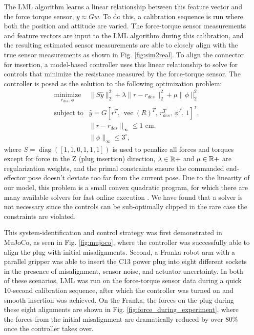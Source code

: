 The LML algorithm learns a linear relationship between this feature vector and the force torque sensor, $y \approx G w$. To do this, a calibration sequence is run where both the position and attitude are varied. The force-torque sensor measurements and feature vectors are input to the LML algorithm during this calibration, and the resulting estimated sensor measurements are able to closely align with the true sensor measurements as shown in Fig. \ref{fig:sim2real}.
To align the connector for insertion, a model-based controller uses this linear relationship to solve for controls that minimize the resistance measured by the force-torque sensor. The controller is posed as the solution to the following optimization problem:
%
\begin{equation}
    \begin{array}{ll}
    \underset{r_{des},\, \phi}{\mbox{minimize}} & \|S\hat{y}\|_2^2 + \lambda \|r - r_{des}\|_2^2 + \mu \| \phi \|_2^2\\ 
    \mbox{subject to} &  \hat{y} = G [r^T,\, \operatorname{vec}(R)^T,\, r_{des}^T,\, \phi^T,\, 1]^T,\\ 
    & \|r - r_{des}\|_\infty \leq 1 \, \, \text{cm}, \\ 
    & \|\phi\|_\infty \leq 3^\circ ,
    \end{array} \label{mdp2}
\end{equation}
%
where $S = \operatorname{diag}([1,1,0,1,1,1])$ is used to penalize all forces and torques except for force in the Z (plug insertion) direction, $\lambda \in \mathbb{R}{+}$ and $\mu \in \mathbb{R}{+}$ are regularization weights, and the primal constraints ensure the commanded end-effector pose doesn't deviate too far from the current pose. Due to the linearity of our model, this problem is a small convex quadratic program, for which there are many available solvers for fast online execution \citep{mattingley2012}. We have found that a solver is not necessary since the controls can be sub-optimally clipped in the rare case the constraints are violated.

This system-identification and control strategy was first demonstrated in MuJoCo, as seen in Fig. \ref{fig:mujoco}, where the controller was successfully able to align the plug with initial misalignments. Second, a Franka robot arm with a parallel gripper was able to insert the C13 power plug into eight different sockets in the presence of misalignment, sensor noise, and actuator uncertainty. In both of these scenarios, LML was run on the force-torque sensor data during a quick 10-second calibration sequence, after which the controller was turned on and smooth insertion was achieved. On the Franka, the forces on the plug during these eight alignments are shown in Fig. \ref{fig:force_during_experiment}, where the forces from the initial misalignment are dramatically reduced by over 80\% once the controller takes over.
%
